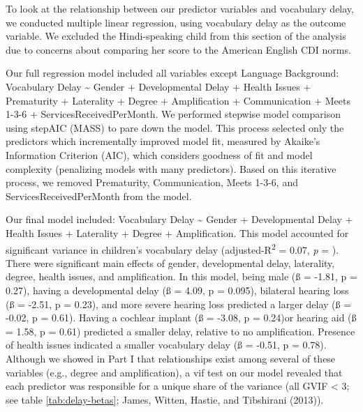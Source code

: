 \documentclass[english,man]{apa6}
\begin{document}
To look at the relationship between our predictor variables and vocabulary delay, we conducted multiple linear regression, using vocabulary delay as the outcome variable. We excluded the Hindi-speaking child from this section of the analysis due to concerns about comparing her score to the American English CDI norms.

Our full regression model included all variables except Language Background: Vocabulary Delay \textasciitilde{} Gender + Developmental Delay + Health Issues + Prematurity + Laterality + Degree + Amplification + Communication + Meets 1-3-6 + ServicesReceivedPerMonth. We performed stepwise model comparison using stepAIC (MASS) to pare down the model. This process selected only the predictors which incrementally improved model fit, measured by Akaike's Information Criterion (AIC), which considers goodness of fit and model complexity (penalizing models with many predictors). Based on this iterative process, we removed Prematurity, Communication, Meets 1-3-6, and ServicesReceivedPerMonth from the model.

Our final model included: Vocabulary Delay \textasciitilde{} Gender + Developmental Delay + Health Issues + Laterality + Degree + Amplification. This model accounted for significant variance in children's vocabulary delay (adjusted-R\textsuperscript{2} = 0.07, \emph{p} = ). There were significant main effects of gender, developmental delay, laterality, degree, health issues, and amplification. In this model, being male (ß = -1.81, p = 0.27), having a developmental delay (ß = 4.09, p = 0.095), bilateral hearing loss (ß = -2.51, p = 0.23), and more severe hearing loss predicted a larger delay (ß = -0.02, p = 0.61). Having a cochlear implant (ß = -3.08, p = 0.24)or hearing aid (ß = 1.58, p = 0.61) predicted a smaller delay, relative to no amplification. Presence of health issues indicated a smaller vocabulary delay (ß = -0.51, p = 0.78). Although we showed in Part I that relationships exist among several of these variables (e.g., degree and amplification), a vif test on our model revealed that each predictor was responsible for a unique share of the variance (all GVIF \textless{} 3; see table \ref{tab:delay-betas}; James, Witten, Hastie, and Tibshirani (2013)).
\end{document}
